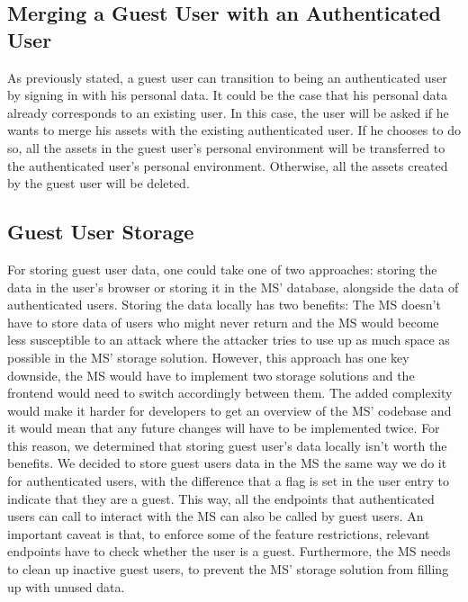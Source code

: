 \subsection{Merging a Guest User with an Authenticated User}
\label{cha:conceptanddesign:users:mergeguestuser}

As previously stated, a guest user can transition to being an authenticated user by
signing in with his personal data.
It could be the case that his personal data already corresponds to an existing user.
In this case, the user will be asked if he wants to merge his assets with the existing
authenticated user.
If he chooses to do so, all the assets in the guest user's personal environment will be
transferred to the authenticated user's personal environment.
Otherwise, all the assets created by the guest user will be deleted.

\subsection{Guest User Storage}

For storing guest user data, one could take one of two approaches:
storing the data in the user's browser or storing it in the MS' database, alongside the
data of authenticated users.
Storing the data locally has two benefits:
The MS doesn't have to store data of users who might never return and
the MS would become less susceptible to an attack where the attacker tries to use up as
much space as possible in the MS' storage solution.
However, this approach has one key downside, the MS would have to implement two storage
solutions and the frontend would need to switch accordingly between them.
The added complexity would make it harder for developers to get an overview of the MS'
codebase and it would mean that any future changes will have to be implemented twice.
For this reason, we determined that storing guest user's data locally isn't worth the benefits.
We decided to store guest users data in the MS the same way we do it for
authenticated users,
with the difference that a flag is set
in the user entry to indicate that they are a guest.
This way, all the endpoints that authenticated users can call to interact with the MS
can also be called by guest users.
An important caveat is that, to enforce some of the feature restrictions, relevant
endpoints have to check whether the user is a guest.
Furthermore, the MS needs to clean up inactive guest users, to prevent the MS' storage
solution from filling up with unused data.

